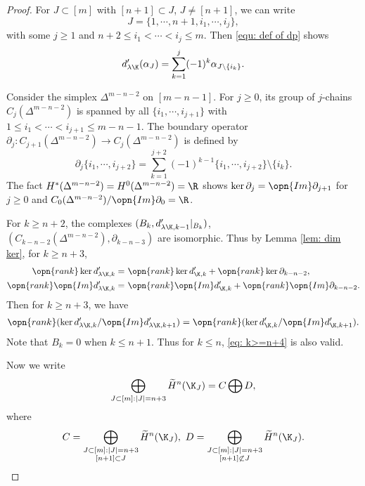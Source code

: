 \begin{proof}
For $J\subset [m]$ with $[n+1]\subset J$, $J\not =[n+1]$, we can write
$$J=\{1,\cdots,n+1,i_1,\cdots,i_j\},$$
with some $j\ge 1$ and $n+2\le i_1< \cdots < i_j\le m$.
Then \eqref{equ: def of dp} shows 
\begin{equation}
\label{eq: d alpha}
d'_{\lambda\K}(\alpha_J)=
\sum_{k=1}^j (-1)^k \alpha_{J\setminus \{i_k\}}.    
\end{equation}


Consider the simplex $\Delta^{m-n-2}$ on $[m-n-1]$.
For $j\ge 0$, its group of $j$-chains $C_j(\Delta^{m-n-2})$ is spanned by
all $\{i_1,\cdots,i_{j+1}\}$ with $1\le i_1<\cdots <i_{j+1}\le m-n-1$.
The boundary operator 
$\partial_j:C_{j+1}(\Delta^{m-n-2})\to C_{j}(\Delta^{m-n-2})$
is defined by
$$\partial_j \{i_1,\cdots,i_{j+2}\}
=\sum_{k=1}^{j+2} (-1)^{k-1} \{i_1,\cdots,i_{j+2}\}
\!\setminus\! \{i_k\}.$$
The fact $H^*(\Delta^{m-n-2})=H^0(\Delta^{m-n-2})=\R$ shows 
$\ker \partial_j=\opn{Im} \partial_{j+1}$ for $j\ge 0$
and $C_0(\Delta^{m-n-2})/\opn{Im} \partial_0=\R$.

For $k\ge n+2$,
the complexes $(B_k,d'_{\lambda\K,k-1}|_{B_k})$, 
$(C_{k-n-2}(\Delta^{m-n-2}),\partial_{k-n-3})$ are isomorphic.
Thus by Lemma \ref{lem: dim ker}, for $k\ge n+3$,
\begin{equation}
\label{eq: rank ker Im for k>=n+3}
    \begin{split}
        \opn{rank}\ker d'_{\lambda\K,k}= &\ 
        \opn{rank}\ker d'_{\K,k}+
        \opn{rank}\ker \partial_{k-n-2},\\
        \opn{rank}\opn{Im} d'_{\lambda\K,k}= &\ 
        \opn{rank}\opn{Im} d'_{\K,k}+
        \opn{rank}\opn{Im} \partial_{k-n-2}.\\ 
    \end{split}
\end{equation}
Then for $k\ge n+3$, we have
\begin{equation}
    \label{eq: k>=n+4}
    \opn{rank}(\ker d'_{\lambda\K,k}/
    \opn{Im} d'_{\lambda\K,k+1})
    = \opn{rank}(\ker d'_{\K,k}/
    \opn{Im} d'_{\K,k+1}).
\end{equation}
Note that $B_k=0$ when $k\le n+1$. Thus for $k\le n$, \eqref{eq: k>=n+4}
is also valid.

Now we write 
$$\bigoplus_{J\subset [m]:|J|=n+3} \widetilde{H}^n(\K_J)=C\bigoplus D,$$
where
$$C=\bigoplus_{\substack{J\subset [m]:|J|=n+3\\ [n+1]\subset J}} \widetilde{H}^n(\K_J),\ 
D=\bigoplus_{\substack{J\subset [m]:|J|=n+3\\ [n+1]\not\subset J}} \widetilde{H}^n(\K_J).$$


\end{proof}
